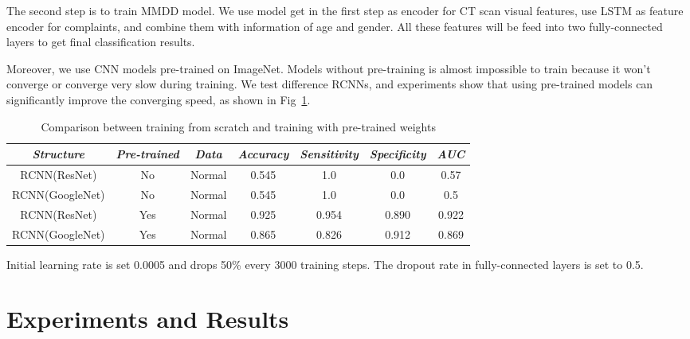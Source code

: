 \documentclass[runningheads]{llncs}
\begin{document}
The second step is to train MMDD model. We use model get in the first step as encoder for CT scan visual features, use LSTM as feature encoder for complaints, and combine them with information of age and gender. All these features will be feed into two fully-connected layers to get final classification results.

Moreover, we use CNN models pre-trained on ImageNet\cite{ILSVRC15}. Models without pre-training is almost impossible to train because it won't converge or converge very slow during training. We test difference RCNNs, and experiments show that using pre-trained models can significantly improve the converging speed, as shown in Fig~\ref{pretrain}.

\begin{table}[htb]
    \vspace{-0cm}
    \caption{Comparison between training from scratch and training with pre-trained weights}
    \vspace{-0cm}
    \begin{center}
    \begin{tabular}{|c|c|c|c|c|c|c|}
    \hline
    \textbf{\textit{Structure}} & \textbf{\textit{Pre-trained}} & \textbf{\textit{Data}}& \textbf{\textit{Accuracy}}  & \textbf{\textit{Sensitivity}} & \textbf{\textit{Specificity}} & \textbf{\textit{AUC}}\\
    \hline
    RCNN(ResNet) &No & Normal & 0.545 & 1.0 &0.0 &0.57 \\
    RCNN(GoogleNet) & No & Normal & 0.545 & 1.0 & 0.0 &0.5\\
    RCNN(ResNet) & Yes & Normal & 0.925 & 0.954 & 0.890 & 0.922\\
    RCNN(GoogleNet) & Yes & Normal & 0.865 & 0.826 & 0.912 & 0.869\\
    
    \hline
    \end{tabular}
    \vspace{-0.5cm}
    \label{pretrain}
    \end{center}
    \vspace{-0.5cm}
    \end{table}

Initial learning rate is set 0.0005 and drops 50\% every 3000 training steps. The dropout rate in fully-connected layers is set to 0.5.

\section{Experiments and Results}
\label{expandres}
\end{document}
